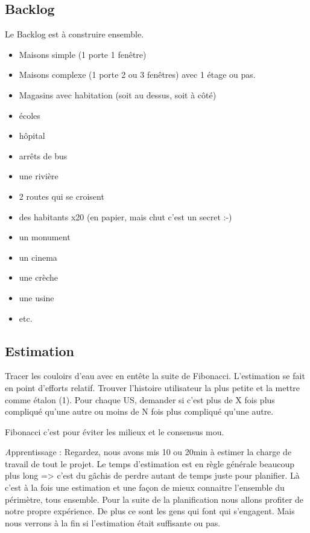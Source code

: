 \documentclass[a4paper,12pt]{article}
\newcommand{\prof}[1]{\textit #1}
\begin{document}
\subsection{Backlog}
Le Backlog est à construire ensemble.

\begin{itemize}
  \item Maisons simple (1 porte 1 fenêtre)
  \item Maisons complexe (1 porte 2 ou 3 fenêtres) avec 1 étage ou pas.
  \item Magasins avec habitation (soit au dessus, soit à côté)
  \item écoles
  \item hôpital
  \item arrêts de bus
  \item une rivière
  \item 2 routes qui se croisent
  \item des habitants x20 (en papier, mais chut c'est un secret :-)
  \item un monument 
  \item un cinema
  \item une crèche
  \item une usine
  \item etc.
\end{itemize}

\subsection{Estimation}
Tracer les couloirs d'eau avec en entête la suite de Fibonacci. 
L'estimation se fait en point d'efforts relatif. 
Trouver l'histoire utilisateur la plus petite et la mettre comme étalon (1). Pour chaque US, demander si c'est plus de X fois plus compliqué qu'une autre ou moins de N fois plus compliqué qu'une autre. 

Fibonacci c'est pour éviter les milieux et le consensus mou. 

\prof{Apprentissage : Regardez, nous avons mis 10 ou 20min à estimer la charge de travail de tout le projet. Le temps d'estimation est en règle générale beaucoup plus long => c'est du gâchis de perdre autant de temps juste pour planifier. Là c'est à la fois une estimation et une façon de mieux connaitre l'ensemble du périmètre, tous ensemble. Pour la suite de la planification nous allons profiter de notre propre expérience. De plus ce sont les gens qui font qui s'engagent. Mais nous verrons à la fin si l'estimation était suffisante ou pas.}
\end{document}
